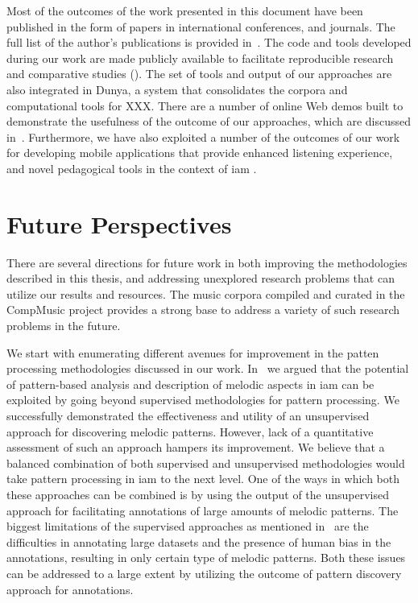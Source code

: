 Most of the outcomes of the work presented in this document have been published in the form of papers in international conferences, and journals. The full list of the author’s publications is provided in~. The code and tools developed during our work are made publicly available to facilitate reproducible research and comparative studies (). The set of tools and output of our approaches are also integrated in Dunya, a system that consolidates the corpora and computational tools for XXX. There are a number of online Web demos built to demonstrate the usefulness of the outcome of our approaches, which are discussed in~\secref{}. Furthermore, we have also exploited a number of the outcomes of our work for developing mobile applications that provide enhanced listening experience, and novel pedagogical tools in the context of \gls{iam} \secref{}.


\section{Future Perspectives }
\label{sec:future_directions}

There are several directions for future work in both improving the methodologies described in this thesis, and addressing unexplored research problems that can utilize our results and resources. The music corpora compiled and curated in the CompMusic project provides a strong base to address a variety of such research problems in the future.

We start with enumerating different avenues for improvement in the patten processing methodologies discussed in our work. In~ we argued that the potential of pattern-based analysis and description of melodic aspects in \gls{iam} can be exploited by going beyond supervised methodologies for pattern processing. We successfully demonstrated the effectiveness and utility of an unsupervised approach for discovering melodic patterns. However, lack of a quantitative assessment of such an approach hampers its improvement. We believe that a balanced combination of both supervised and unsupervised methodologies would take pattern processing in \gls{iam} to the next level. One of the ways in which both these approaches can be combined is by using the output of the unsupervised approach for facilitating annotations of large amounts of melodic patterns. The biggest limitations of the supervised approaches as mentioned in~ are the difficulties in annotating large datasets and the presence of human bias in the annotations, resulting in only certain type of melodic patterns. Both these issues can be addressed to a large extent by utilizing the outcome of pattern discovery approach for annotations.

